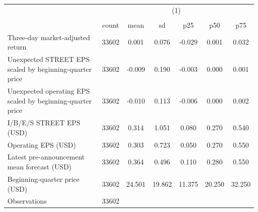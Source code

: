 {
\def\sym#1{\ifmmode^{#1}\else\(^{#1}\)\fi}
\begin{tabular}{l*{1}{cccccc}}
\hline\hline
                    &\multicolumn{6}{c}{(1)}                                                      \\
                    &\multicolumn{6}{c}{}                                                         \\
                    &       count&        mean&          sd&         p25&         p50&         p75\\
\hline
Three-day market-adjusted return&       33602&       0.001&       0.076&      -0.029&       0.001&       0.032\\
Unexpected STREET EPS scaled by beginning-quarter price&       33602&      -0.009&       0.190&      -0.003&       0.000&       0.001\\
Unexpected operating EPS scaled by beginning-quarter price&       33602&      -0.010&       0.113&      -0.006&       0.000&       0.002\\
I/B/E/S STREET EPS (USD)&       33602&       0.314&       1.051&       0.080&       0.270&       0.540\\
Operating EPS (USD) &       33602&       0.303&       0.723&       0.050&       0.270&       0.550\\
Latest pre-announcement mean forecast (USD)&       33602&       0.364&       0.496&       0.110&       0.280&       0.550\\
Beginning-quarter price (USD)&       33602&      24.501&      19.862&      11.375&      20.250&      32.250\\
\hline
Observations        &       33602&            &            &            &            &            \\
\hline\hline
\end{tabular}
}
